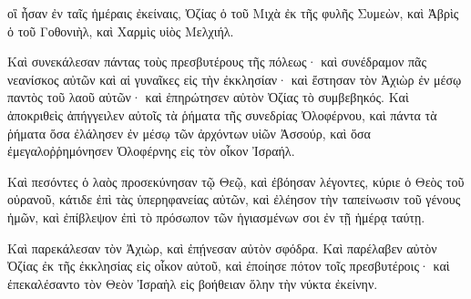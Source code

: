 {οἳ ἦσαν ἐν ταῖς ἡμέραις ἐκείναις, Ὀζίας ὁ τοῦ Μιχὰ ἐκ τῆς φυλῆς Συμεὼν, καὶ Ἀβρὶς ὁ τοῦ Γοθονιὴλ, καὶ Χαρμὶς υἱὸς Μελχιήλ.
\par }{\PP {}Καὶ συνεκάλεσαν πάντας τοὺς πρεσβυτέρους τῆς πόλεως· καὶ συνέδραμον πᾶς νεανίσκος αὐτῶν καὶ αἱ γυναῖκες εἰς τὴν ἐκκλησίαν· καὶ ἔστησαν τὸν Ἀχιὼρ ἐν μέσῳ παντὸς τοῦ λαοῦ αὐτῶν· καὶ ἐπηρώτησεν αὐτὸν Ὀζίας τὸ συμβεβηκός.
Καὶ ἀποκριθεὶς ἀπήγγειλεν αὐτοῖς τὰ ῥήματα τῆς συνεδρίας Ὀλοφέρνου, καὶ πάντα τὰ ῥήματα ὅσα ἐλάλησεν ἐν μέσῳ τῶν ἀρχόντων υἱῶν Ἀσσούρ, καὶ ὅσα ἐμεγαλοῤῥημόνησεν Ὀλοφέρνης εἰς τὸν οἶκον Ἰσραήλ.
\par }{\PP {}Καὶ πεσόντες ὁ λαὸς προσεκύνησαν τῷ Θεῷ, καὶ ἐβόησαν λέγοντες,
κύριε ὁ Θεὸς τοῦ οὐρανοῦ, κάτιδε ἐπὶ τὰς ὑπερηφανείας αὐτῶν, καὶ ἐλέησον τὴν ταπείνωσιν τοῦ γένους ἡμῶν, καὶ ἐπίβλεψον ἐπὶ τὸ πρόσωπον τῶν ἡγιασμένων σοι ἐν τῇ ἡμέρᾳ ταύτῃ.
\par }{\PP {}Καὶ παρεκάλεσαν τὸν Ἀχιὼρ, καὶ ἐπῄνεσαν αὐτὸν σφόδρα.
Καὶ παρέλαβεν αὐτὸν Ὀζίας ἐκ τῆς ἐκκλησίας εἰς οἶκον αὐτοῦ, καὶ ἐποίησε πότον τοῖς πρεσβυτέροις· καὶ ἐπεκαλέσαντο τὸν Θεὸν Ἰσραὴλ εἰς βοήθειαν ὅλην τὴν νύκτα ἐκείνην.

}
